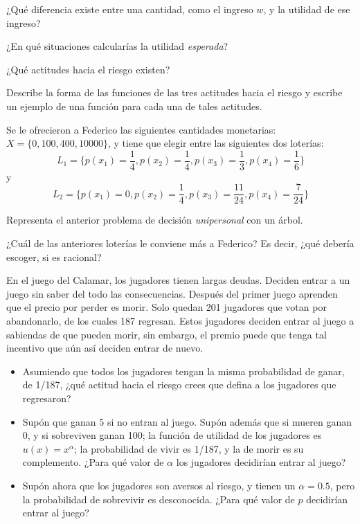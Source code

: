 \documentclass[12pt]{article}
\begin{document}
\begin{myenum}
	\item ¿Qué diferencia existe entre una cantidad, como el ingreso $ w $, y la utilidad de ese ingreso?
	\item ¿En qué situaciones calcularías la utilidad \textit{esperada}?
	\item ¿Qué actitudes hacia el riesgo existen?
	\item Describe la forma de las funciones de las tres actitudes hacia el riesgo y escribe un ejemplo de una función para cada una de tales actitudes.
	\item Se le ofrecieron a Federico las siguientes cantidades monetarias: $ X = \{0, 100, 400, 10000\} $, y tiene que elegir entre las siguientes dos loterías:
	\[ L_1 = \Biggl\{p(x_1)=\frac{1}{4}, p(x_2)=\frac{1}{4}, p(x_3)=\frac{1}{3}, p(x_4)=\frac{1}{6}\Biggr\} \]
	y
	\[L_2 = \Biggl\{p(x_1)=0, p(x_2)=\frac{1}{4}, p(x_3)=\frac{11}{24}, p(x_4)=\frac{7}{24}\Biggr\} \]
	\begin{myenum}
		\item Representa el anterior problema de decisión \textit{unipersonal} con un árbol.
		\item ¿Cuál de las anteriores loterías le conviene más a Federico? Es decir, ¿qué debería escoger, si es racional?
	\end{myenum}
	\item En el juego del Calamar, los jugadores tienen largas deudas. Deciden entrar a un juego sin saber del todo las consecuencias. Después del primer juego aprenden que el precio por perder es morir. Solo quedan 201 jugadores que votan por abandonarlo, de los cuales 187 regresan. Estos jugadores deciden entrar al juego a sabiendas de que pueden morir, sin embargo, el premio puede que tenga tal incentivo que aún así deciden entrar de nuevo.
	\begin{itemize}
		\item Asumiendo que todos los jugadores tengan la misma probabilidad de ganar, de 1/187, ¿qué actitud hacia el riesgo crees que defina a los jugadores que regresaron?
		\item Supón que ganan 5 si no entran al juego. Supón además que si mueren ganan 0, y si sobreviven ganan 100; la función de utilidad de los jugadores es $ u(x) = x^\alpha $; la probabilidad de vivir es 1/187, y la de morir es su complemento. ¿Para qué valor de $ \alpha $ los jugadores decidirían entrar al juego?
		\item Supón ahora que los jugadores son aversos al riesgo, y tienen un $ \alpha = 0.5 $, pero la probabilidad de sobrevivir es desconocida. ¿Para qué valor de $ p $ decidirían entrar al juego?
	\end{itemize}
\end{myenum}
\end{document}
